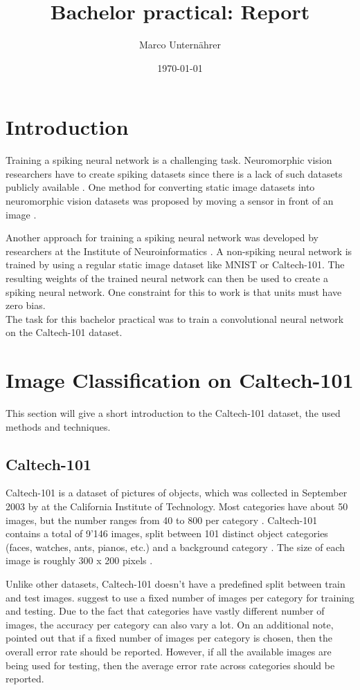 \documentclass[a4paper, 11pt]{article}
\title{Bachelor practical: Report}
\author{Marco Unternährer}
\date{\today}
\begin{document}
\maketitle

\section{Introduction}

Training a spiking neural network is a challenging task.
Neuromorphic vision researchers have to create spiking datasets since there is a lack of such datasets publicly available .
One method for converting static image datasets into neuromorphic vision datasets was proposed by moving a sensor in front of an image \cite{Orchard2015}.

Another approach for training a spiking neural network was developed by researchers at the Institute of Neuroinformatics \cite{Diehl2015}.
A non-spiking neural network is trained by using a regular static image dataset like MNIST or Caltech-101.
The resulting weights of the trained neural network can then be used to create a spiking neural network.
One constraint for this to work is that units must have zero bias.\\

The task for this bachelor practical was to train a convolutional neural network on the Caltech-101 dataset.



\section{Image Classification on Caltech-101}
This section will give a short introduction to the Caltech-101 dataset, the used methods and techniques.

\subsection{Caltech-101}
Caltech-101 is a dataset of pictures of objects, which was collected in September 2003 by \citet{Fei-Fei2007} at the California Institute of Technology.
Most categories have about 50 images, but the number ranges from 40 to 800 per category \cite{Fei-Fei2007}.
Caltech-101 contains a total of 9'146 images, split between 101 distinct object categories (faces, watches, ants, pianos, etc.) and a background category \cite{Caltech101Wiki}.
The size of each image is roughly 300 x 200 pixels \cite{Fei-Fei2007}.

Unlike other datasets, Caltech-101 doesn't have a predefined split between train and test images.
\citet{Fei-Fei2007} suggest to use a fixed number of images per category for training and testing.
Due to the fact that categories have vastly different number of images, the accuracy per category can also vary a lot.
On an additional note, \cite{Fei-Fei2007} pointed out that if a fixed number of images per category is chosen, then the overall error rate should be reported.
However, if all the available images are being used for testing, then the average error rate across categories should be reported.\\
\end{document}
